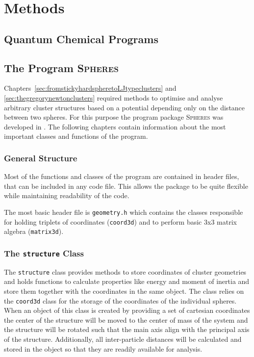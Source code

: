 
\part{Methods}
\label{sec:methods}

\chapter{Quantum Chemical Programs}
\label{sec:quantumchemicalprograms}

\chapter{The Program \textsc{Spheres}}
\label{sec:theprogramspheres}

Chapters~\ref{sec:fromstickyhardspheretoLJtypeclusters} and
\ref{sec:thegregorynewtonclusters} required methods to optimise and analyse
arbitrary cluster structures based on a potential depending only on the
distance between two spheres. For this purpose the program package
\textsc{Spheres} was developed in \Cpp. The following chapters contain
information about the most important classes and functions of the program.

\section{General Structure}
\label{sec:generalstructure}

Most of the functions and classes of the program are contained in header files,
that can be included in any code file. This allows the package to be quite
flexible while maintaining readability of the code.

The most basic header file is \verb|geometry.h| which contains the classes
responsible for holding triplets of coordinates (\verb|coord3d|) and to
perform basic 3x3 matrix algebra (\verb|matrix3d|).

\section{The \texttt{structure} Class}
\label{sec:thestructureclass}

The \verb|structure| class provides methods to store coordinates of cluster
geometries and holds functions to calculate properties like energy and moment
of inertia and store them together with the coordinates in the same object. The
class relies on the \verb|coord3d| class for the storage of the coordinates of
the individual spheres.  When an object of this class is created by providing a
set of cartesian coordinates the center of the structure will be moved to the
center of mass of the system and the structure will be rotated such that the
main axis align with the principal axis of the structure. Additionally, all
inter-particle distances will be calculated and stored in the object so that
they are readily available for analysis.

